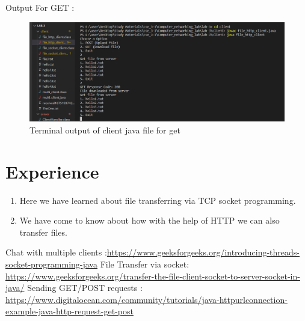 \documentclass[11pt]{article}
\begin{document}
 Output For GET : 
\begin{figure}[!h]
\centering
\includegraphics[width=\textwidth]{get_client.png}
\caption{Terminal output of client java file for get }
\end{figure}
\FloatBarrier




\section{Experience}
\begin{enumerate}
   \item Here we have learned about file transferring via TCP socket programming.
    \item We have come to know about how with the help of HTTP we can also transfer files.
\end{enumerate}
\begin{thebibliography}{1}
  Chat with multiple clients :\url{https://www.geeksforgeeks.org/introducing-threads-socket-programming-java}
 File Transfer via socket: \url{https://www.geeksforgeeks.org/transfer-the-file-client-socket-to-server-socket-in-java/}
 Sending GET/POST requests : \url{https://www.digitalocean.com/community/tutorials/java-httpurlconnection-example-java-http-request-get-post}
\end{thebibliography}
\end{document}
